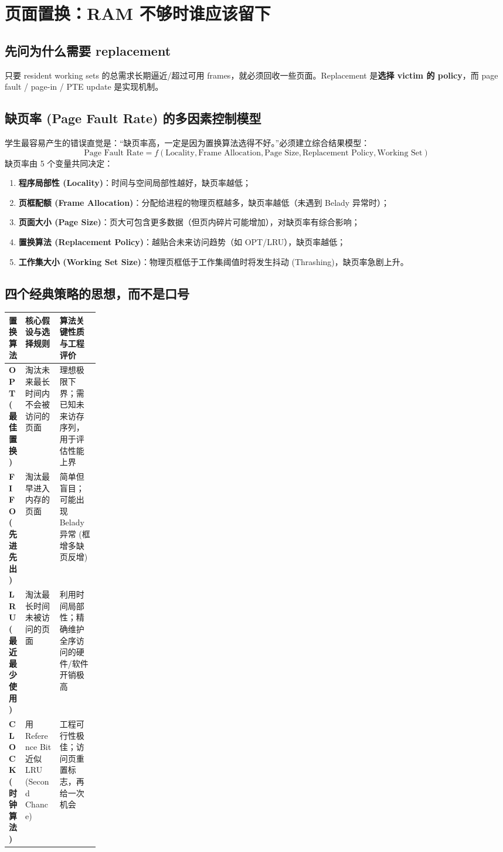\documentclass[11pt,a4paper]{ctexart}
\newcommand{\kw}[1]{\textbf{#1}}
\begin{document}
\section{页面置换：RAM 不够时谁应该留下}

\subsection{先问为什么需要 replacement}
只要 resident working sets 的总需求长期逼近/超过可用 frames，就必须回收一些页面。Replacement 是\kw{选择 victim 的 policy}，而 page fault / page-in / PTE update 是实现机制。

\subsection{缺页率 (Page Fault Rate) 的多因素控制模型}

学生最容易产生的错误直觉是：“缺页率高，一定是因为置换算法选得不好。”必须建立综合结果模型：
\[
\boxed{
\text{Page Fault Rate} = f(
\text{Locality},
\text{Frame Allocation},
\text{Page Size},
\text{Replacement Policy},
\text{Working Set}
)
}
\]
缺页率由 5 个变量共同决定：
\begin{enumerate}
  \item \kw{程序局部性 (Locality)}：时间与空间局部性越好，缺页率越低；
  \item \kw{页框配额 (Frame Allocation)}：分配给进程的物理页框越多，缺页率越低（未遇到 Belady 异常时）；
  \item \kw{页面大小 (Page Size)}：页大可包含更多数据（但页内碎片可能增加），对缺页率有综合影响；
  \item \kw{置换算法 (Replacement Policy)}：越贴合未来访问趋势（如 OPT/LRU），缺页率越低；
  \item \kw{工作集大小 (Working Set Size)}：物理页框低于工作集阈值时将发生抖动 (Thrashing)，缺页率急剧上升。
\end{enumerate}

\subsection{四个经典策略的思想，而不是口号}
\begingroup
\small
\renewcommand{\arraystretch}{1.25}
\setlength{\tabcolsep}{3pt}
\noindent\begin{tabularx}{\linewidth}{>{\bfseries}p{0.18\linewidth} X X}
\toprule
置换算法 & 核心假设与选择规则 & 算法关键性质与工程评价\\
\midrule
OPT (最佳置换) & 淘汰未来最长时间内不会被访问的页面 & 理想极限下界；需已知未来访存序列，用于评估性能上界\\
FIFO (先进先出) & 淘汰最早进入内存的页面 & 简单但盲目；可能出现 Belady 异常 (框增多缺页反增)\\
LRU (最近最少使用) & 淘汰最长时间未被访问的页面 & 利用时间局部性；精确维护全序访问的硬件/软件开销极高\\
CLOCK (时钟算法) & 用 Reference Bit 近似 LRU (Second Chance) & 工程可行性极佳；访问页重置标志，再给一次机会\\
\bottomrule
\end{tabularx}
\endgroup
\end{document}
